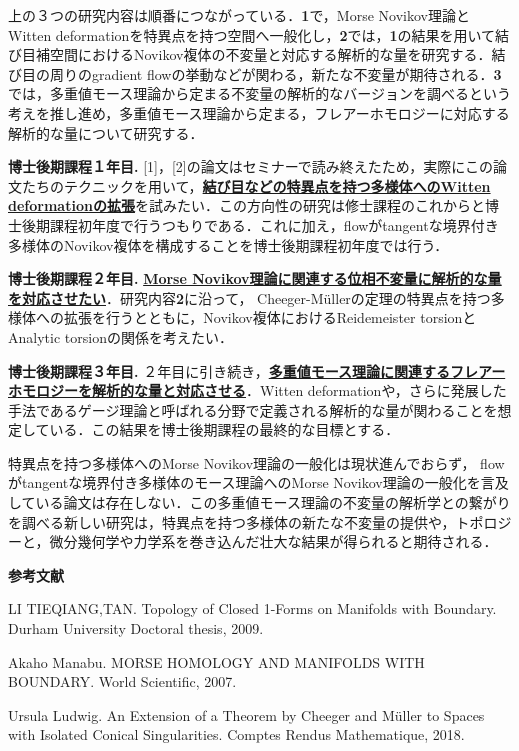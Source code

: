 \documentclass[11pt,a4j,dvipdfmx]{jarticle} 					%
\newcommand{\研究課題名}{象の卵}
\newcommand{\研究機関名}{京都大学}
\newcommand{\研究代表者氏名}{福士謙二}
\begin{document}
上の３つの研究内容は順番につながっている．\textbf{1}で，Morse Novikov理論とWitten deformationを特異点を持つ空間へ一般化し，\textbf{2}では，\textbf{1}の結果を用いて結び目補空間におけるNovikov複体の不変量と対応する解析的な量を研究する．結び目の周りのgradient flowの挙動などが関わる，新たな不変量が期待される．\textbf{3}では，多重値モース理論から定まる不変量の解析的なバージョンを調べるという考えを推し進め，多重値モース理論から定まる，フレアーホモロジーに対応する解析的な量について研究する．

\noindent
\textbf{博士後期課程１年目. }[1]，[2]の論文はセミナーで読み終えたため，実際にこの論文たちのテクニックを用いて，\textbf{\ul{結び目などの特異点を持つ多様体へのWitten deformationの拡張}}を試みたい．この方向性の研究は修士課程のこれからと博士後期課程初年度で行うつもりである．これに加え，flowがtangentな境界付き多様体のNovikov複体を構成することを博士後期課程初年度では行う．

\noindent
\textbf{博士後期課程２年目. }
\textbf{\ul{Morse Novikov理論に関連する位相不変量に解析的な量を対応させたい}}．研究内容\textbf{2}に沿って，
Cheeger-M\"{u}llerの定理の特異点を持つ多様体への拡張を行うとともに，Novikov複体におけるReidemeister torsionとAnalytic torsionの関係を考えたい．

\noindent
\textbf{博士後期課程３年目. }２年目に引き続き，\textbf{\ul{多重値モース理論に関連するフレアーホモロジーを解析的な量と対応させる}}．Witten deformationや，さらに発展した手法であるゲージ理論と呼ばれる分野で定義される解析的な量が関わることを想定している．この結果を博士後期課程の最終的な目標とする．


\noindent
{}

特異点を持つ多様体へのMorse Novikov理論の一般化は現状進んでおらず，
flowがtangentな境界付き多様体のモース理論へのMorse Novikov理論の一般化を言及している論文は存在しない．この多重値モース理論の不変量の解析学との繋がりを調べる新しい研究は，特異点を持つ多様体の新たな不変量の提供や，トポロジーと，微分幾何学や力学系を巻き込んだ壮大な結果が得られると期待される．



\vspace{2mm}
\noindent \textbf{参考文献}

\noindent
[1] LI TIEQIANG,TAN. Topology of Closed 1-Forms on Manifolds with Boundary. Durham University Doctoral thesis, 2009.


\noindent
[2] Akaho Manabu. MORSE HOMOLOGY AND MANIFOLDS WITH BOUNDARY. World Scientific, 2007.

\noindent
[3] Ursula Ludwig. An Extension of a Theorem by Cheeger and M\"{u}ller to Spaces with Isolated Conical Singularities. Comptes Rendus Mathematique, 2018.
\end{document}
